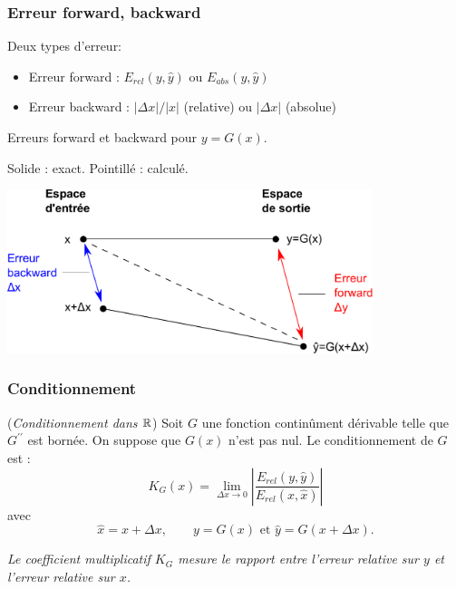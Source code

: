 \documentclass{beamer}
\begin{document}

\begin{frame}
\frametitle{Erreur forward, backward}

Deux types d'erreur:
\begin{itemize}
\item Erreur forward : $E_{rel}(y,\hat{y})$ ou $E_{abs}(y,\hat{y})$
\item Erreur backward : $|\Delta x|/|x|$ (relative) ou $|\Delta x|$ (absolue)
\end{itemize}

Erreurs forward et backward pour $y=G(x)$. 

Solide : exact. Pointillé : calculé.

\begin{center}
\includegraphics[width=0.8\textwidth]{forwardbackward}
\end{center}

\end{frame}


\begin{frame}
\frametitle{Conditionnement}

\begin{definition}
(\emph{Conditionnement dans $\mathbb{R}$})
Soit $G$ une fonction continûment dérivable telle que 
$G^{\prime\prime}$ est bornée. 
On suppose que $G(x)$ n'est pas nul. 
Le conditionnement de $G$ est :
$$
K_G(x)= \lim_{\Delta x \rightarrow 0} \left| \frac{E_{rel}(y,\hat{y})}{E_{rel}(x,\hat{x})}\right|
$$
avec
$$
\hat{x}=x+\Delta x, \qquad y=G(x) \textrm{ et }
\hat{y} = G(x+\Delta x).
$$
\end{definition}

\emph{Le coefficient multiplicatif $K_G$ mesure le rapport entre 
l'erreur relative sur $y$ et l'erreur relative sur $x$.}

\end{frame}
\end{document}
